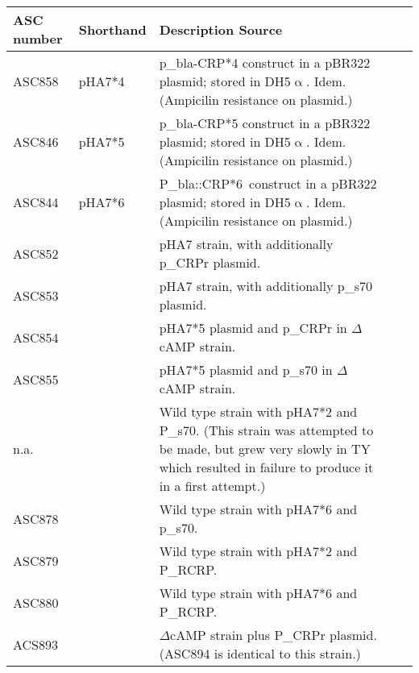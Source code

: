 \begin{table}[h]
    \begin{tabularx}{\textwidth}{llXll}
        	\textbf{ASC number}	& \textbf{Shorthand} & \textbf{Description}	\textbf{Source} \\
        \hline
ASC858	&	pHA7*4	& p\_bla-CRP*4 construct in a pBR322 plasmid; stored in DH5$\upalpha$. Idem. (Ampicilin resistance on plasmid.) & \cite{Aiba1985, Towbin2017} \\
ASC846	&	pHA7*5	& p\_bla-CRP*5 construct in a pBR322 plasmid; stored in DH5$\upalpha$. Idem. (Ampicilin resistance on plasmid.) & \cite{Aiba1985, Towbin2017} \\
ASC844	&	pHA7*6	& P\_bla::CRP*6 construct in a pBR322 plasmid; stored in DH5$\upalpha$.  Idem. (Ampicilin resistance on plasmid.) & \cite{Aiba1985, Towbin2017} \\
%                        
ASC852	&	& pHA7 strain, with additionally p\_CRPr plasmid. & \\
ASC853	&	& pHA7 strain, with additionally p\_s70 plasmid. & \\
ASC854	&	& pHA7*5 plasmid and p\_CRPr in $\Delta$cAMP strain. & \\
ASC855	&	& pHA7*5 plasmid and p\_s70 in $\Delta$cAMP strain. & \\
%
n.a.	&		& Wild type strain with pHA7*2 and P\_s70. (This strain was attempted to be made, but grew very slowly in TY which resulted in failure to produce it in a first attempt.)  & \\
ASC878	&		& Wild type strain with pHA7*6 and p\_s70. & \\
%
ASC879	&		& Wild type strain with pHA7*2 and P\_RCRP.  & \\
ASC880	&		& Wild type strain with pHA7*6 and P\_RCRP.  & \\
%
ACS893	&		& $\Delta$cAMP strain plus P\_CRPr plasmid. (ASC894 is identical to this strain.) & \\

\end{tabularx}
\end{table}
